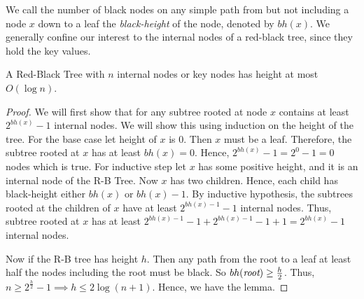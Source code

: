 We call the number of black nodes on any simple path from  but not including a node $x$ down to a leaf the \emph{black-height} of the node, denoted by $bh(x)$. We generally confine our interest to the internal nodes of a red-black tree, since they hold the key values.
\begin{Lemma}{}{}
	A Red-Black Tree with $n$ internal nodes or key nodes has height at most $O(\log n)$.
\end{Lemma}
\begin{proof}
	We will first show that for any subtree rooted at node $x$ contains at least $2^{bh(x)}-1$ internal nodes. We will show this using induction on the height of the tree. For the base case let height of $x$ is $0$. Then $x$ must be a leaf. Therefore, the subtree rooted at $x$ has at least $bh(x)=0$. Hence, $2^{bh(x)}-1=2^0-1=0$  nodes which is true. For inductive step let $x$ has some positive height, and it is an internal node of the R-B Tree. Now $x$ has two children. Hence, each child has black-height either $bh(x)$ or $bh(x)-1$. By inductive hypothesis, the subtrees rooted at the children of $x$ have at least $2^{bh(x)-1}-1$ internal nodes. Thus, subtree rooted at $x$ has at least $2^{bh(x)-1}-1+2^{bh(x)-1}-1+1=2^{bh(x)}-1$ internal nodes.

	Now if the R-B tree has height $h$. Then any path from the root to a leaf at least half the nodes including the root must be black. So $bh(\emph{root})\geq \frac{h}2$. Thus, $n\geq 2^{\frac{h}2}-1\implies h\leq 2\log(n+1)$. Hence, we have the lemma.
\end{proof}

